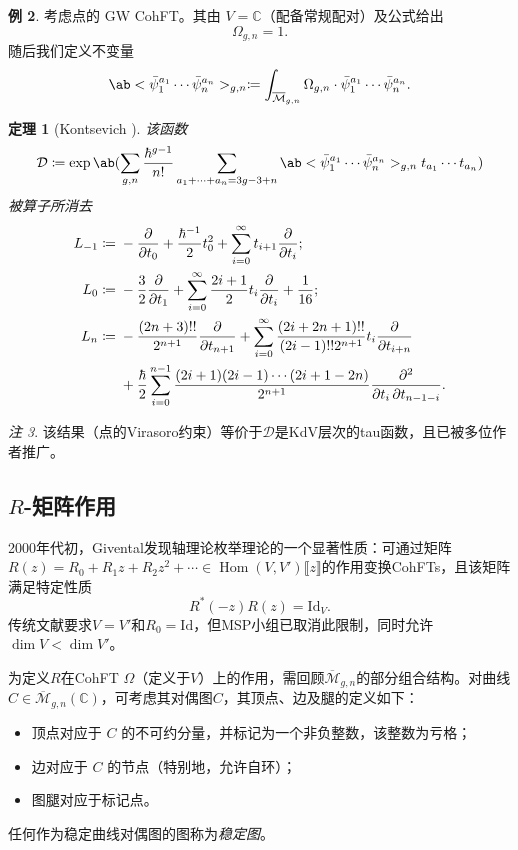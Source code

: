 \documentclass{amsart}
\newtheorem{thm}{定理}[section]
\theoremstyle{definition}
\newtheorem{exm}[thm]{例}
\theoremstyle{remark}
\newtheorem{rmk}[thm]{注}
\theoremstyle{plain}
\theoremstyle{definition}
\theoremstyle{remark}
\newcommand{\C}{\mathbb{C}}
\newcommand{\Mbar}{\overline{\mathcal{M}}}
\newcommand{\mc}[1]{\mathcal{#1}}
\newcommand{\mr}[1]{\mathrm{#1}}
\newcommand{\1}{\mathbf{1}}
\newcommand{\2}{\mathbf{2}}
\newcommand{\3}{\mathbf{3}}
\newcommand{\ps}[1]{\llbracket #1 \rrbracket}
\DeclareMathOperator{\Hom}{Hom}
\begin{document}
\begin{exm}
考虑点的 GW CohFT。其由 $V = \C$（配备常规配对）及公式给出
    \[ \Omega_{g,n} = 1. \]
随后我们定义不变量
    \[ \ab<\bar{\psi}_1^{a_1} \cdots \bar{\psi}_n^{a_n}>_{g,n} \coloneqq \int_{\Mbar_{g,n}} \Omega_{g,n} \cdot \bar{\psi}_1^{a_1} \cdots \bar{\psi}_n^{a_n}. \]
    \begin{thm}[Kontsevich {\cite{Kontsevich1992}}]
该函数
        \[ \mc{D} \coloneqq \exp \ab(\sum_{g,n} \frac{\hbar^{g-1}}{n!}\sum_{a_1 + \cdots + a_n = 3g-3+n} \ab<\bar{\psi}_1^{a_1} \cdots \bar{\psi}_n^{a_n}>_{g,n} t_{a_1}\cdots t_{a_n}) \]
被算子所消去
        \begin{align*}
            L_{-1} \coloneqq{}& -\pdv{}{t_0} + \frac{\hbar^{-1}}{2} t_0^2 + \sum_{i=0}^{\infty} t_{i+1} \pdv{}{t_i};\\
            L_0 \coloneqq{}& -\frac{3}{2} \pdv{}{t_1} + \sum_{i=0}^{\infty} \frac{2i+1}{2} t_i \pdv{}{t_i} + \frac{1}{16};\\
            L_n \coloneqq{}& -\frac{(2n+3)!!}{2^{n+1}} \pdv{}{t_{n+1}} + \sum_{i=0}^{\infty} \frac{(2i+2n+1)!!}{(2i-1)!! 2^{n+1}} t_i \pdv{}{t_{i+n}} \\
            &+ \frac{\hbar}{2} \sum_{i=0}^{n-1} \frac{(2i+1) (2i-1) \cdots (2i+1-2n)}{2^{n+1}} \pdv{}{t_i,t_{n-1-i}}.
        \end{align*}
    \end{thm}
\end{exm}

\begin{rmk}
该结果（点的Virasoro约束）等价于$\mc{D}$是KdV层次的tau函数，且已被多位作者推广。
\end{rmk}



\subsection{$R$-矩阵作用}%
\label{sub:R-matrix action}

2000年代初，Givental发现轴理论枚举理论的一个显著性质：可通过矩阵$R(z) = R_0 + R_1 z + R_2 z^2 + \cdots \in \Hom(V, V')\ps{z}$的作用变换CohFTs，且该矩阵满足特定性质
\[ R^*(-z) R(z) = \mr{Id}_V. \]
传统文献要求$V = V'$和$R_0 = \mr{Id}$，但MSP小组已取消此限制，同时允许$\dim V < \dim V'$。

为定义$R$在CohFT $\Omega$（定义于$V$）上的作用，需回顾$\Mbar_{g,n}$的部分组合结构。对曲线$C\in \Mbar_{g,n}(\C)$，可考虑其对偶图$C$，其顶点、边及腿的定义如下：
\begin{itemize}
    \item 顶点对应于 $C$ 的不可约分量，并标记为一个非负整数，该整数为亏格；
    \item 边对应于 $C$ 的节点（特别地，允许自环）；
    \item 图腿对应于标记点。
\end{itemize}
任何作为稳定曲线对偶图的图称为\textit{稳定图}。
\end{document}
